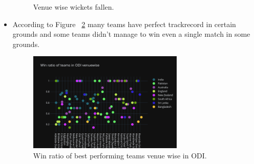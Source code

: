 \documentclass[fleqn,10pt]{wlscirep}
\begin{document}
\begin{itemize}
\begin{figure}[H]
        \caption{Venue wise wickets fallen.}
        \label{fig:three}
      \end{figure}
      \item According to Figure ~\ref{fig:four} many teams have perfect trackrecord in certain grounds and some teams didn't manage to win even a single match in some grounds.
      \begin{figure}[H]
        \centering
        \includegraphics[width=0.7\textwidth]{teamvenue.png}
        \caption{Win ratio of best performing teams venue wise in ODI.}
        \label{fig:four}
      \end{figure}
      

\end{itemize}
\end{document}
